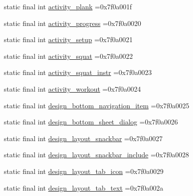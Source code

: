 \begin{DoxyCompactItemize}
\item 
static final int \mbox{\hyperlink{classcom_1_1example_1_1trainawearapplication_1_1_r_1_1layout_aee32c819f64546d816eef1019ec71bfe}{activity\+\_\+plank}} =0x7f0a001f
\item 
static final int \mbox{\hyperlink{classcom_1_1example_1_1trainawearapplication_1_1_r_1_1layout_a294253efb588aa67a61203d087ba7e72}{activity\+\_\+progress}} =0x7f0a0020
\item 
static final int \mbox{\hyperlink{classcom_1_1example_1_1trainawearapplication_1_1_r_1_1layout_a0ac4d7988d03111570a7765c91541e8c}{activity\+\_\+setup}} =0x7f0a0021
\item 
static final int \mbox{\hyperlink{classcom_1_1example_1_1trainawearapplication_1_1_r_1_1layout_a752a9cb10df3d7e0a0b11a81f930fb0f}{activity\+\_\+squat}} =0x7f0a0022
\item 
static final int \mbox{\hyperlink{classcom_1_1example_1_1trainawearapplication_1_1_r_1_1layout_aae5ea58400b3120f15fdea2871573ea9}{activity\+\_\+squat\+\_\+instr}} =0x7f0a0023
\item 
static final int \mbox{\hyperlink{classcom_1_1example_1_1trainawearapplication_1_1_r_1_1layout_aa83fde7d1c7a55321588482644b18dac}{activity\+\_\+workout}} =0x7f0a0024
\item 
static final int \mbox{\hyperlink{classcom_1_1example_1_1trainawearapplication_1_1_r_1_1layout_af6afc7ca879e198fef94f4937b05d412}{design\+\_\+bottom\+\_\+navigation\+\_\+item}} =0x7f0a0025
\item 
static final int \mbox{\hyperlink{classcom_1_1example_1_1trainawearapplication_1_1_r_1_1layout_a2af577daca5544a5c24b00324c42a376}{design\+\_\+bottom\+\_\+sheet\+\_\+dialog}} =0x7f0a0026
\item 
static final int \mbox{\hyperlink{classcom_1_1example_1_1trainawearapplication_1_1_r_1_1layout_a001d1096c267d553764b89c26bc3b1ef}{design\+\_\+layout\+\_\+snackbar}} =0x7f0a0027
\item 
static final int \mbox{\hyperlink{classcom_1_1example_1_1trainawearapplication_1_1_r_1_1layout_adf201b01a06f475e0da998c984332f05}{design\+\_\+layout\+\_\+snackbar\+\_\+include}} =0x7f0a0028
\item 
static final int \mbox{\hyperlink{classcom_1_1example_1_1trainawearapplication_1_1_r_1_1layout_a779efc50edcf6f1c16e33d1127c782d1}{design\+\_\+layout\+\_\+tab\+\_\+icon}} =0x7f0a0029
\item 
static final int \mbox{\hyperlink{classcom_1_1example_1_1trainawearapplication_1_1_r_1_1layout_aaef2c76d6aaf0a6b5478827876a57f25}{design\+\_\+layout\+\_\+tab\+\_\+text}} =0x7f0a002a

\end{DoxyCompactItemize}
